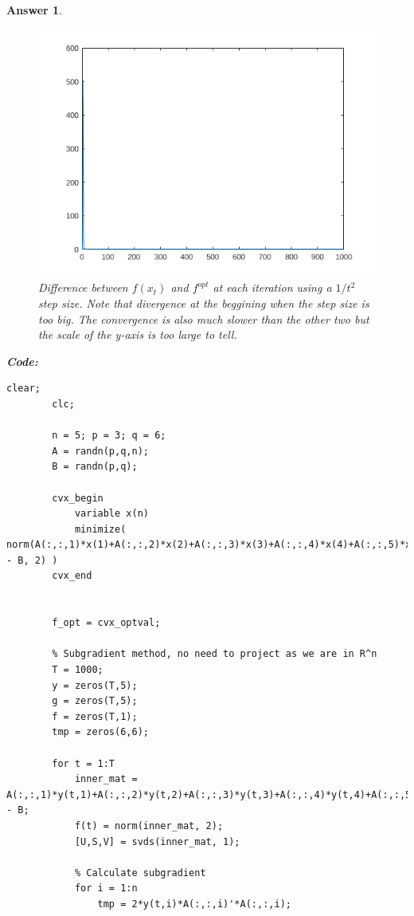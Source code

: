 \documentclass[12pt]{article}
\theoremstyle{colon}
\newtheorem*{answer}{Answer}
\begin{document}
\begin{answer}
\begin{enumerate}[label=\alph*)]
      \begin{figure}[H]
        \centering
          \includegraphics[width=\textwidth]{eta-t2}
        \caption{Difference between $f(x_t)$ and $f^{opt}$ at each iteration using a $1/t^2$ step size. Note that divergence at the beggining when the step size is too big. The convergence is also much slower than the other two but the scale of the y-axis is too large to tell.}
      \end{figure}

      \textbf{Code:}

      \begin{lstlisting}[style=Matlab-editor, basicstyle=\scriptsize]
        clear;
        clc;

        n = 5; p = 3; q = 6;
        A = randn(p,q,n);
        B = randn(p,q);

        cvx_begin
            variable x(n)    
            minimize( norm(A(:,:,1)*x(1)+A(:,:,2)*x(2)+A(:,:,3)*x(3)+A(:,:,4)*x(4)+A(:,:,5)*x(5) - B, 2) )
        cvx_end


        f_opt = cvx_optval;

        % Subgradient method, no need to project as we are in R^n
        T = 1000;
        y = zeros(T,5);
        g = zeros(T,5);
        f = zeros(T,1);
        tmp = zeros(6,6);

        for t = 1:T
            inner_mat = A(:,:,1)*y(t,1)+A(:,:,2)*y(t,2)+A(:,:,3)*y(t,3)+A(:,:,4)*y(t,4)+A(:,:,5)*y(t,5) - B;
            f(t) = norm(inner_mat, 2);
            [U,S,V] = svds(inner_mat, 1);
            
            % Calculate subgradient
            for i = 1:n
                tmp = 2*y(t,i)*A(:,:,i)'*A(:,:,i);
                

\end{lstlisting}
\end{enumerate}
\end{answer}
\end{document}
